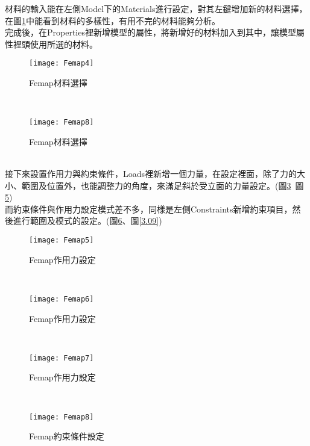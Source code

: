 \begin{itemize}
\qquad 材料的輸入能在左側Model下的Materials進行設定，對其左鍵增加新的材料選擇，在圖\ref{3.04}中能看到材料的多樣性，有用不完的材料能夠分析。\\
\qquad 完成後，在Properties裡新增模型的屬性，將新增好的材料加入到其中，讓模型屬性裡頭使用所選的材料。\\
\begin{figure}[hbt!]
\begin{center}
\texttt{[image: Femap4]}
\caption{\Large Femap材料選擇}\label{3.04}
\end{center}
\end{figure}
\\
\begin{figure}[hbt!]
\begin{center}
\texttt{[image: Femap8]}
\caption{\Large Femap材料選擇}\label{3.05}
\end{center}
\end{figure}
\\
\qquad 接下來設置作用力與約束條件，Loads裡新增一個力量，在設定裡面，除了力的大小、範圍及位置外，也能調整力的角度，來滿足斜於受立面的力量設定。(圖\ref{3.05}~圖\ref{3.07})\\
\qquad 而約束條件與作用力設定模式差不多，同樣是左側Constraints新增約束項目，然後進行範圍及模式的設定。(圖\ref{3.08}、圖\ref{3.09})\\
\begin{figure}[hbt!]
\begin{center}
\texttt{[image: Femap5]}
\caption{\Large Femap作用力設定}\label{3.05}
\end{center}
\end{figure}
\\
\begin{figure}[hbt!]
\begin{center}
\texttt{[image: Femap6]}
\caption{\Large Femap作用力設定}\label{3.06}
\end{center}
\end{figure}
\\
\begin{figure}[hbt!]
\begin{center}
\texttt{[image: Femap7]}
\caption{\Large Femap作用力設定}\label{3.07}
\end{center}
\end{figure}
\\
\begin{figure}[hbt!]
\begin{center}
\texttt{[image: Femap8]}
\caption{\Large Femap約束條件設定}\label{3.08}

\end{center}
\end{figure}
\end{itemize}
